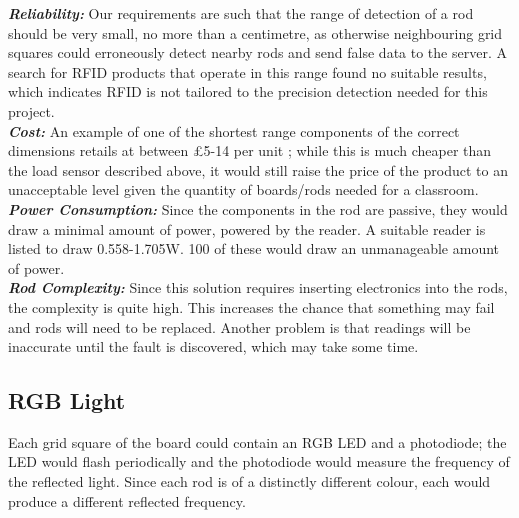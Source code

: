 {
\setlength{\parindent}{0pt} 

\textbf{\textit{Reliability:}} Our requirements are such that the range of detection of a rod should be very small, no more than a centimetre, as otherwise neighbouring grid squares could erroneously detect nearby rods and send false data to the server. A search for RFID products that operate in this range found no suitable results, which indicates RFID is not tailored to the precision detection needed for this project.\\

\textbf{\textit{Cost:}} An example of one of the shortest range components of the correct dimensions retails at between £5-14 per unit \cite{RITRPR9U23:online}; while this is much cheaper than the load sensor described above, it would still raise the price of the product to an unacceptable level given the quantity of boards/rods needed for a classroom.\\

\textbf{\textit{Power Consumption:}} Since the components in the rod are passive, they would draw a minimal amount of power, powered by the reader. A suitable reader \cite{AS3991BQ49:online} is listed to draw 0.558-1.705W. 100 of these would draw an unmanageable amount of power. \\

\textbf{\textit{Rod Complexity:}} Since this solution requires inserting electronics into the rods, the complexity is quite high. This increases the chance that something may fail and rods will need to be replaced. Another problem is that readings will be inaccurate until the fault is discovered, which may take some time. \\
}



\subsection{RGB Light}
\label{rgb}

Each grid square of the board could contain an RGB LED and a photodiode; the LED would flash periodically and the photodiode would measure the frequency of the reflected light. Since each rod is of a distinctly different colour, each would produce a different reflected frequency.\\

